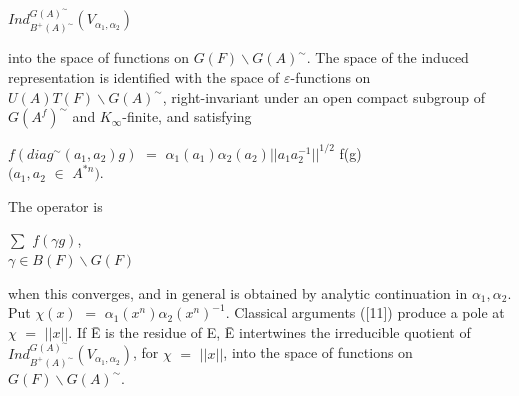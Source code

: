 \documentclass[10pt,a4paper]{article}
\begin{document}
\clearpage
{}
\label{d035-physical-031}
\par\medskip{}\par\smallskip
\par\medskip{}\par\smallskip
\par\smallskip\begin{center}\begin{minipage}{0.96\textwidth}\centering
$Ind_{B^+(A)^\sim}^{G(A)^\sim}(V_{\alpha{}_1,\alpha{}_2})$
\end{minipage}\end{center}\smallskip
\par into the space of functions on $G(F)\backslash G(A)^\sim$. The space of the induced representation is identified with the space of $\varepsilon{}$-functions on $U(A)T(F)\backslash G(A)^\sim$, right-invariant under an open compact subgroup of $G(A^f)^\sim$ and $K_\infty{}$-finite, and satisfying\par
\par\smallskip\begin{center}\begin{minipage}{0.96\textwidth}\centering
$f(diag^\sim(a_1,a_2)g)$ $=$ $\alpha{}_1(a_1)\alpha{}_2(a_2)||a_1a_2^{-1}||^{1/2}$ f(g) \\ $(a_1,a_2$ $\in{}$ $A^{*n})$.
\end{minipage}\end{center}\smallskip
\par The operator is\par
\par\smallskip\begin{center}\begin{minipage}{0.96\textwidth}\centering
$\sum{}$ $f(\gamma{}g)$, \\ $\gamma{}\in{}B(F)\backslash G(F)$
\end{minipage}\end{center}\smallskip
\par when this converges, and in general is obtained by analytic continuation in $\alpha{}_1,\alpha{}_2$. Put $\chi{}(x)$ $=$ $\alpha{}_1(x^n)\alpha{}_2(x^n)^{-1}$. Classical arguments ([11]) produce a pole at $\chi{}$ $=$ $||x||$. If Ē is the residue of E, Ē intertwines the irreducible quotient of $Ind_{B^+(A)^\sim}^{G(A)^\sim}(V_{\alpha{}_1,\alpha{}_2})$, for $\chi{}$ $=$ $||x||$, into the space of functions on $G(F)\backslash G(A)^\sim$.\par
\end{document}
